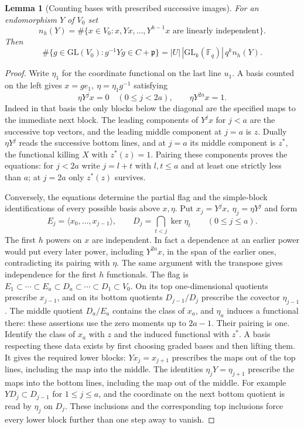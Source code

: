 \documentclass[a4paper,11pt]{article}
\newtheorem{lemma}[proposition]{Lemma}
\theoremstyle{definition}
\theoremstyle{remark}
\numberwithin{equation}{section}
\begin{document}
\begin{lemma}[Counting bases with prescribed successive images]\leavevmode
\label{lem:cyclicframes705}
For an endomorphism \(Y\) of \(V_0\) set
\[
 n_h(Y)=\#\{x\in V_0:x,Yx,\ldots,Y^{h-1}x
                            \text{ are linearly independent}\}.
\]
Then
\[
 \#\{g\in\mathrm{GL}(V_0): g^{-1}Yg\in C+\mathfrak p\}
           =|U|\,|\mathrm{GL}_k(\mathbb F_q)|\,q^k n_h(Y).
\]
\end{lemma}
\begin{proof}
Write \(\eta_1\) for the coordinate functional on the last
line \(u_1\). A basis counted on the left gives
\(x=g e_1,\ \eta=\eta_1 g^{-1}\) satisfying
\[
     \eta Y^j x=0\quad (0\le j<2a),\qquad
     \eta Y^{2a}x=1 .
\]
Indeed in that basis the only blocks below the diagonal
are the specified maps to the immediate next block. The
leading components of \(Y^j x\) for \(j<a\) are the successive
top vectors, and the leading middle component at \(j=a\) is
\(z\). Dually \(\eta Y^j\) reads the successive bottom lines,
and at \(j=a\) its middle component is \(z^*\), the functional
killing \(X\) with \(z^*(z)=1\). Pairing these components proves
the equations: for \(j<2a\) write \(j=l+t\) with \(l,t\le a\)
and at least one strictly less than \(a\); at \(j=2a\) only
\(z^*(z)\) survives.

Conversely, the equations determine the partial flag and
the simple-block identifications of every possible basis
above \(x,\eta\). Put \(x_j=Y^j x,\ \eta_j=\eta Y^j\)
and form
\[
    E_j=\langle x_0,\ldots,x_{j-1}\rangle,\qquad
    D_j=\bigcap_{t<j}\ker\eta_t \qquad (0\le j\le a).
\]
The first \(h\) powers on \(x\) are independent. In fact a
dependence at an earlier power would put every later power,
including \(Y^{2a}x\), in the span of the earlier ones,
contradicting its pairing with \(\eta\). The same argument
with the transpose gives independence for the first \(h\)
functionals. The flag is
\(E_1\subset\cdots\subset E_a\subset D_a\subset\cdots
\subset D_1\subset V_0\). On its top one-dimensional
quotients prescribe \(x_{j-1}\), and on its bottom quotients
\(D_{j-1}/D_j\) prescribe the covector \(\eta_{j-1}\).
The middle quotient \(D_a/E_a\) contains the class of \(x_a\),
and \(\eta_a\) induces a functional there: these assertions
use the zero moments up to \(2a-1\). Their pairing is one.
Identify the class of \(x_a\) with \(z\) and the induced
functional with \(z^*\). A basis respecting these data exists
by first choosing graded bases and then lifting them. It
gives the required lower blocks: \(Yx_j=x_{j+1}\) prescribes
the maps out of the top lines, including the map into the
middle. The identities \(\eta_j Y=\eta_{j+1}\) prescribe
the maps into the bottom lines, including the map out of
the middle. For example \(YD_j\subset D_{j-1}\) for
\(1\le j\le a\), and the coordinate on the next bottom
quotient is read by \(\eta_j\) on \(D_j\). These inclusions
and the corresponding top inclusions force every lower block
further than one step away to vanish.


\end{proof}
\end{document}
